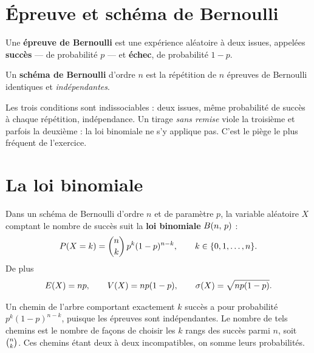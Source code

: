 \section{Épreuve et schéma de Bernoulli}

\begin{definition}
Une \textbf{épreuve de Bernoulli} est une expérience aléatoire à deux issues,
appelées \textbf{succès} — de probabilité $p$ — et \textbf{échec}, de
probabilité $1-p$.

Un \textbf{schéma de Bernoulli} d'ordre $n$ est la répétition de $n$ épreuves
de Bernoulli identiques et \emph{indépendantes}.
\end{definition}

\begin{avertissement}
Les trois conditions sont indissociables : deux issues, même probabilité de
succès à chaque répétition, indépendance. Un tirage \emph{sans remise} viole
la troisième et parfois la deuxième : la loi binomiale ne s'y applique pas.
C'est le piège le plus fréquent de l'exercice.
\end{avertissement}

\section{La loi binomiale}

\begin{theoreme}
Dans un schéma de Bernoulli d'ordre $n$ et de paramètre $p$, la variable
aléatoire $X$ comptant le nombre de succès suit la \textbf{loi binomiale}
$\loibin{n}{p}$ :
\[
  \proba{X = k} = \combi{k}{n}\,p^{k}(1-p)^{n-k},
  \qquad k \in \{0,1,\dots,n\}.
\]
De plus
\[
  \Esp(X) = np, \qquad \Var(X) = np(1-p), \qquad
  \ecart(X) = \sqrt{np(1-p)} .
\]
\end{theoreme}

\begin{demonstration}
Un chemin de l'arbre comportant exactement $k$ succès a pour probabilité
$p^{k}(1-p)^{n-k}$, puisque les épreuves sont indépendantes. Le nombre de tels
chemins est le nombre de façons de choisir les $k$ rangs des succès parmi $n$,
soit $\combi{k}{n}$. Ces chemins étant deux à deux incompatibles, on somme
leurs probabilités.
\end{demonstration}

